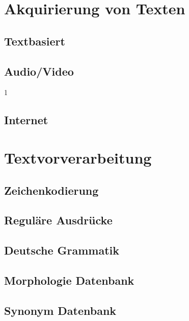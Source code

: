 
\section{Akquirierung von Texten}	
    \subsection{Textbasiert}
    \subsection{Audio/Video}	1
    \subsection{Internet}	

\section{Textvorverarbeitung}
    \subsection{Zeichenkodierung}
    \subsection{Reguläre Ausdrücke	}
    \subsection{Deutsche Grammatik	}
    \subsection{Morphologie Datenbank	}
    \subsection{Synonym Datenbank}
